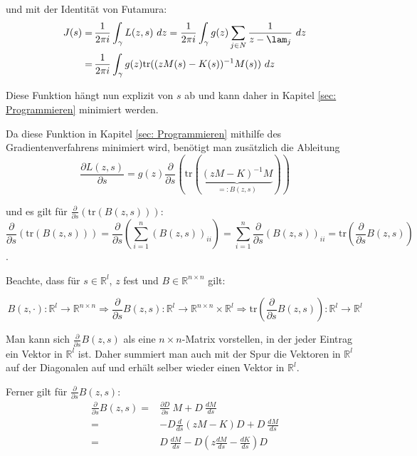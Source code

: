 \documentclass[a4paper,12pt]{report}
\newcommand{\R}{\mathbb R}
\newcommand{\klammer}[1]{\left(#1\right)}
\newcommand{\tr}{\text{tr}}
\newcommand{\inv}{^{-1}}
\newcommand{\1}{\mathds{1}}
\theoremstyle{plain} %
\theoremstyle{definition} %
\theoremstyle{remark}
\begin{document}
            und mit der Identität von Futamura:
            \begin{align}
                  J(s) =&\, \frac 1 {2\pi i}\int_\gamma L(z,s)\ dz = \frac 1 {2\pi i}\int_\gamma g(z)\sum_{j\in N} \frac{1}{z-\lam_j}\ dz\nonumber\\
                  =&\, \frac 1 {2\pi i}\int_\gamma g(z)\tr((zM(s)-K(s))\inv M(s))\ dz\label{eqn: JGleichIntTr}
            \end{align}

            Diese Funktion hängt nun explizit von $s$ ab und kann daher in Kapitel \ref{sec: Programmieren} minimiert werden.
            
            Da diese Funktion in Kapitel \ref{sec: Programmieren} mithilfe des Gradientenverfahrens minimiert wird, benötigt man zusätzlich die Ableitung
            \begin{equation}
                  \label{eqn: AbleitungZielfunktion}
                  \frac{\partial L(z,s)}{\partial s} = g(z) \frac{\partial}{\partial s}\klammer{\tr(\underbrace{(zM-K)\inv M}_{=:B(z, s)})}
            \end{equation}

            und es gilt für $\frac{\partial}{\partial s} \klammer{\tr(B(z, s))}$:
            $$\frac{\partial}{\partial s} \klammer{\tr(B(z, s))} = \frac{\partial}{\partial s} \klammer{\sum_{i=1}^n (B(z, s))_{ii}} = \sum_{i=1}^n \frac{\partial}{\partial s} (B(z,s))_{ii} = \tr\klammer{\frac{\partial}{\partial s} B(z,s)}$$.

            Beachte, dass für $s\in \R^l$, $z$ fest und $B\in \R^{n\times n}$ gilt:

            $$B(z, \cdot): \R^l \to \R^{n\times n}\Rightarrow \frac{\partial}{\partial s} B(z, s) : \R^l\to \R^{n\times n}\times \R^l \Rightarrow \tr\klammer{\frac{\partial}{\partial s} B(z, s)}: \R^l \to \R^l$$

            Man kann sich $\frac{\partial}{\partial s} B(z, s)$ als eine $n\times n$-Matrix vorstellen, in der jeder Eintrag ein Vektor in $\R^l$ ist.
            Daher summiert man auch mit der Spur die Vektoren in $\R^l$ auf der Diagonalen auf und erhält selber wieder einen Vektor in $\R^l$.
            
            Ferner gilt für $\frac{\partial}{\partial s} B(z, s)$:
            \begin{align*}
                  \frac{\partial}{\partial s} B(z, s) =& \frac{\partial D}{\partial s} \ M + D \ \frac{dM}{ds}\\
                  =& - D \frac{d}{ds}(zM-K) D + D \ \frac{dM}{ds}\\
                  =& D \ \frac{dM}{ds} - D \klammer{z \frac{dM}{ds}-\frac{dK}{ds}} D
            \end{align*}
\end{document}
